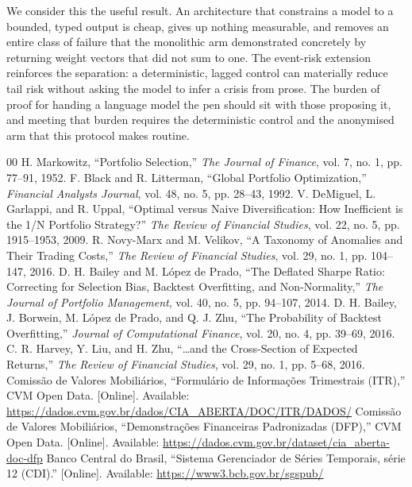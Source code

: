 \documentclass[10pt,conference]{IEEEtran}
\begin{document}
We consider this the useful result. An architecture that constrains a model to a bounded, typed output is cheap, gives up nothing measurable, and removes an entire class of failure that the monolithic arm demonstrated concretely by returning weight vectors that did not sum to one. The event-risk extension reinforces the separation: a deterministic, lagged control can materially reduce tail risk without asking the model to infer a crisis from prose. The burden of proof for handing a language model the pen should sit with those proposing it, and meeting that burden requires the deterministic control and the anonymised arm that this protocol makes routine.

\begin{thebibliography}{00}
 H. Markowitz, ``Portfolio Selection,'' \emph{The Journal of Finance}, vol. 7, no. 1, pp. 77--91, 1952.
 F. Black and R. Litterman, ``Global Portfolio Optimization,'' \emph{Financial Analysts Journal}, vol. 48, no. 5, pp. 28--43, 1992.
 V. DeMiguel, L. Garlappi, and R. Uppal, ``Optimal versus Naive Diversification: How Inefficient is the 1/N Portfolio Strategy?'' \emph{The Review of Financial Studies}, vol. 22, no. 5, pp. 1915--1953, 2009.
 R. Novy-Marx and M. Velikov, ``A Taxonomy of Anomalies and Their Trading Costs,'' \emph{The Review of Financial Studies}, vol. 29, no. 1, pp. 104--147, 2016.
 D. H. Bailey and M. L\'opez de Prado, ``The Deflated Sharpe Ratio: Correcting for Selection Bias, Backtest Overfitting, and Non-Normality,'' \emph{The Journal of Portfolio Management}, vol. 40, no. 5, pp. 94--107, 2014.
 D. H. Bailey, J. Borwein, M. L\'opez de Prado, and Q. J. Zhu, ``The Probability of Backtest Overfitting,'' \emph{Journal of Computational Finance}, vol. 20, no. 4, pp. 39--69, 2016.
 C. R. Harvey, Y. Liu, and H. Zhu, ``\ldots and the Cross-Section of Expected Returns,'' \emph{The Review of Financial Studies}, vol. 29, no. 1, pp. 5--68, 2016.
 Comiss\~ao de Valores Mobili\'arios, ``Formul\'ario de Informa\c{c}\~oes Trimestrais (ITR),'' CVM Open Data. [Online]. Available: \url{https://dados.cvm.gov.br/dados/CIA_ABERTA/DOC/ITR/DADOS/}
 Comiss\~ao de Valores Mobili\'arios, ``Demonstra\c{c}\~oes Financeiras Padronizadas (DFP),'' CVM Open Data. [Online]. Available: \url{https://dados.cvm.gov.br/dataset/cia_aberta-doc-dfp}
 Banco Central do Brasil, ``Sistema Gerenciador de S\'eries Temporais, s\'erie 12 (CDI).'' [Online]. Available: \url{https://www3.bcb.gov.br/sgspub/}
\end{thebibliography}
\end{document}
